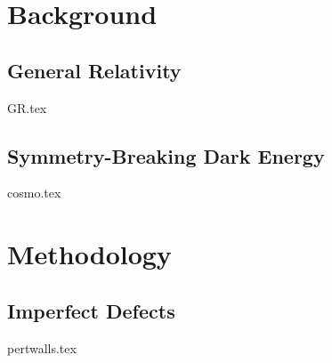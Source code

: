 \documentclass[UKenglish]{texmex/uiomasterthesis}
\begin{document}




\part{Background}\label{part:bckg}


\chapter{General Relativity}\label{chap:GR}
    {{GR.tex}}

\chapter{Symmetry-Breaking Dark Energy}\label{chap:cosmo}
    {{cosmo.tex}}













\part{Methodology}\label{part:method}




\chapter{Imperfect Defects}\label{chap:pertwalls}
    {{pertwalls.tex}}
\end{document}

